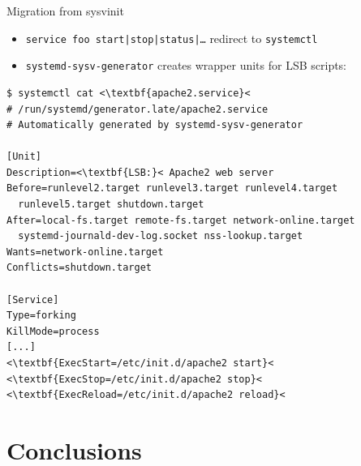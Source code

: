 \documentclass[11pt,final,usepdftitle=false]{beamer}
\begin{document}
\begin{frame}[fragile]{Migration from sysvinit}
\begin{itemize}
	\item \texttt{service foo start|stop|status|\ldots} redirect to \texttt{systemctl}
	\hbr
\item \texttt{systemd-sysv-generator} creates wrapper units for LSB scripts:
	\end{itemize}
	\vspace{-0.5em}
\begin{center}
\begin{adjustbox}{height=0.40\textheight,keepaspectratio}
\begin{lstlisting}[basicstyle=\ttfamily\tiny,escapeinside={<<}]
$ systemctl cat <\textbf{apache2.service}<
# /run/systemd/generator.late/apache2.service
# Automatically generated by systemd-sysv-generator

[Unit]
Description=<\textbf{LSB:}< Apache2 web server
Before=runlevel2.target runlevel3.target runlevel4.target
  runlevel5.target shutdown.target
After=local-fs.target remote-fs.target network-online.target
  systemd-journald-dev-log.socket nss-lookup.target
Wants=network-online.target
Conflicts=shutdown.target

[Service]
Type=forking
KillMode=process
[...]
<\textbf{ExecStart=/etc/init.d/apache2 start}<
<\textbf{ExecStop=/etc/init.d/apache2 stop}<
<\textbf{ExecReload=/etc/init.d/apache2 reload}<
\end{lstlisting}
\end{adjustbox}
\end{center}
\end{frame}

\section{Conclusions}
\end{document}
